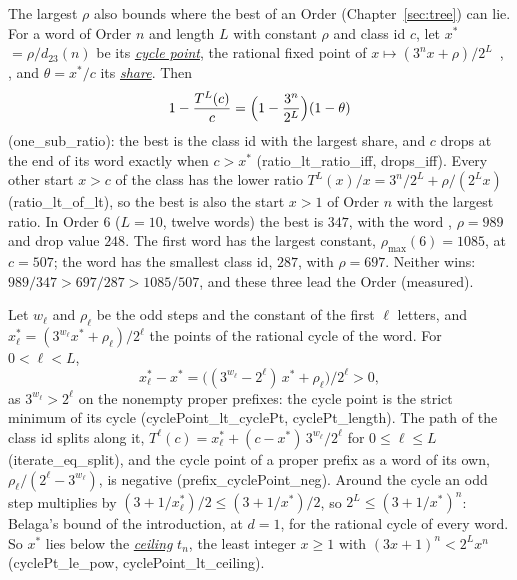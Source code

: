 \documentclass[10pt,a4paper,titlepage]{article}
\makeatletter
\newcommand{\termhere}[1]{\leavevmode
  \Hy@raisedlink{\hyper@anchorstart{term:#1}\hyper@anchorend}}
\newcommand{\keyterm}[2]{\hyperlink{box:#1}{\emph{#2}}}
\newcommand{\keysym}[2]{\hyperlink{box:#1}{#2}}
\newcommand{\lean}[1]{\textsf{#1}}
\makeatother
\begin{document}
The largest $\rho$ also bounds where the best of an Order (Chapter~\ref{sec:tree}) can lie. For
a word of Order $n$ and length $L$ with constant $\rho$ and class id $c$, \termhere{cyclepoint}let
\keysym{cyclepoint}{$x^\ast$} $= \rho/d_{23}(n)$ be its \keyterm{cyclepoint}{cycle point}, the rational
fixed point of $x \mapsto (3^n x + \rho)/2^L$~\cite[Prop.~5]{BohmSontacchi1978},
\cite[Thm.~2.1]{Lagarias1990}, and \termhere{share}$\theta = x^\ast/c$ its
\keyterm{share}{share}. Then
\[
1 - \frac{T^L(c)}{c} = \Bigl(1 - \frac{3^n}{2^L}\Bigr)(1 - \theta)
\]
(\lean{one\_sub\_ratio}): the best is the class id with the largest share, and $c$ drops at the end of
its word exactly when $c > x^\ast$ (\lean{ratio\_lt\_ratio\_iff}, \lean{drops\_iff}). Every other start
$x > c$ of the class has the lower ratio $T^L(x)/x = 3^n/2^L + \rho/(2^L x)$
(\lean{ratio\_lt\_of\_lt}), so the best is also the start $x > 1$ of Order $n$ with the largest ratio.
In Order $6$ ($L = 10$, twelve words) the best is $347$, with the word , $\rho = 989$
and drop value $248$. The first word  has the largest constant,
$\rho_{\max}(6) = 1085$, at $c = 507$; the word  has the smallest class id, $287$,
with $\rho = 697$. Neither wins: $989/347 > 697/287 > 1085/507$, and these three lead the Order
(measured).

Let $w_\ell$ and $\rho_\ell$ be the odd steps and the constant of the first $\ell$ letters, and
$x^\ast_\ell = (3^{w_\ell}x^\ast + \rho_\ell)/2^\ell$ the points of the rational cycle of the word. For
$0 < \ell < L$,
\[
x^\ast_\ell - x^\ast = \bigl((3^{w_\ell} - 2^\ell)\,x^\ast + \rho_\ell\bigr)/2^\ell > 0,
\]
as $3^{w_\ell} > 2^\ell$ on the nonempty proper prefixes: the cycle point is the strict minimum of
its cycle (\lean{cyclePoint\_lt\_cyclePt}, \lean{cyclePt\_length}). The path of the class id splits
along it, $T^\ell(c) = x^\ast_\ell + (c - x^\ast)\,3^{w_\ell}/2^\ell$ for $0 \le \ell \le L$
(\lean{iterate\_eq\_split}), and the cycle point of a proper prefix as a word of its own,
$\rho_\ell/(2^\ell - 3^{w_\ell})$, is negative (\lean{prefix\_cyclePoint\_neg}). Around the cycle an
odd step multiplies by $(3 + 1/x^\ast_\ell)/2 \le (3 + 1/x^\ast)/2$, so $2^L \le (3 + 1/x^\ast)^n$:
Belaga's bound of the introduction, at $d = 1$, for the rational cycle of every word. \termhere{ceiling}So
$x^\ast$ lies below the \keyterm{ceiling}{ceiling} \keysym{ceiling}{$t_n$}, the least integer
$x \ge 1$ with $(3x + 1)^n < 2^L x^n$ (\lean{cyclePt\_le\_pow}, \lean{cyclePoint\_lt\_ceiling}).
\end{document}
